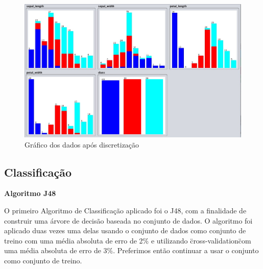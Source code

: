 \begin{figure}[H]
    \centering
    \includegraphics[scale=0.3]{tex/img/img1i.jpg}
    \caption{Gráfico dos dados após discretização}
    \label{fig:apos}
\end{figure}

\newpage
\subsection{Classificação}

\textbf{Algoritmo J48}

O primeiro Algoritmo de Classificação aplicado foi o J48, com a finalidade de construir uma árvore de decisão baseada no conjunto de dados. O algoritmo foi aplicado duas vezes uma delas usando o conjunto de dados como conjunto de treino com uma média absoluta de erro de 2\% e utilizando \"cross-validation\" com uma média absoluta de erro de 3\%. Preferimos então continuar a usar o conjunto como conjunto de treino.

